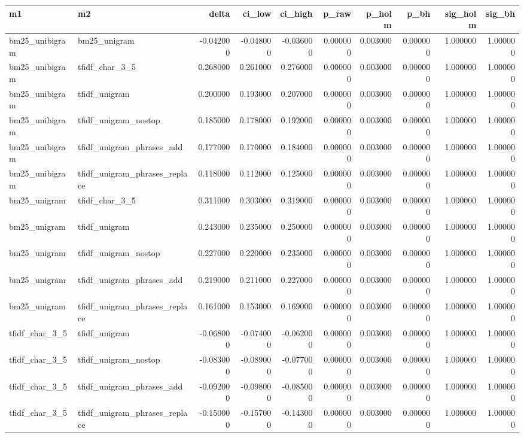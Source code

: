 \begin{tabular}{llrrrrrrrr}
\toprule
m1 & m2 & delta & ci_low & ci_high & p_raw & p_holm & p_bh & sig_holm & sig_bh \\
\midrule
bm25_unibigram & bm25_unigram & -0.042000 & -0.048000 & -0.036000 & 0.000000 & 0.003000 & 0.000000 & 1.000000 & 1.000000 \\
bm25_unibigram & tfidf_char_3_5 & 0.268000 & 0.261000 & 0.276000 & 0.000000 & 0.003000 & 0.000000 & 1.000000 & 1.000000 \\
bm25_unibigram & tfidf_unigram & 0.200000 & 0.193000 & 0.207000 & 0.000000 & 0.003000 & 0.000000 & 1.000000 & 1.000000 \\
bm25_unibigram & tfidf_unigram_nostop & 0.185000 & 0.178000 & 0.192000 & 0.000000 & 0.003000 & 0.000000 & 1.000000 & 1.000000 \\
bm25_unibigram & tfidf_unigram_phrases_add & 0.177000 & 0.170000 & 0.184000 & 0.000000 & 0.003000 & 0.000000 & 1.000000 & 1.000000 \\
bm25_unibigram & tfidf_unigram_phrases_replace & 0.118000 & 0.112000 & 0.125000 & 0.000000 & 0.003000 & 0.000000 & 1.000000 & 1.000000 \\
bm25_unigram & tfidf_char_3_5 & 0.311000 & 0.303000 & 0.319000 & 0.000000 & 0.003000 & 0.000000 & 1.000000 & 1.000000 \\
bm25_unigram & tfidf_unigram & 0.243000 & 0.235000 & 0.250000 & 0.000000 & 0.003000 & 0.000000 & 1.000000 & 1.000000 \\
bm25_unigram & tfidf_unigram_nostop & 0.227000 & 0.220000 & 0.235000 & 0.000000 & 0.003000 & 0.000000 & 1.000000 & 1.000000 \\
bm25_unigram & tfidf_unigram_phrases_add & 0.219000 & 0.211000 & 0.227000 & 0.000000 & 0.003000 & 0.000000 & 1.000000 & 1.000000 \\
bm25_unigram & tfidf_unigram_phrases_replace & 0.161000 & 0.153000 & 0.169000 & 0.000000 & 0.003000 & 0.000000 & 1.000000 & 1.000000 \\
tfidf_char_3_5 & tfidf_unigram & -0.068000 & -0.074000 & -0.062000 & 0.000000 & 0.003000 & 0.000000 & 1.000000 & 1.000000 \\
tfidf_char_3_5 & tfidf_unigram_nostop & -0.083000 & -0.089000 & -0.077000 & 0.000000 & 0.003000 & 0.000000 & 1.000000 & 1.000000 \\
tfidf_char_3_5 & tfidf_unigram_phrases_add & -0.092000 & -0.098000 & -0.085000 & 0.000000 & 0.003000 & 0.000000 & 1.000000 & 1.000000 \\
tfidf_char_3_5 & tfidf_unigram_phrases_replace & -0.150000 & -0.157000 & -0.143000 & 0.000000 & 0.003000 & 0.000000 & 1.000000 & 1.000000 \\

\end{tabular}
